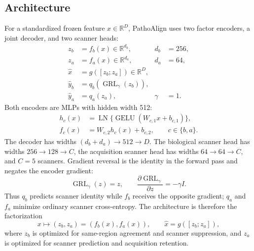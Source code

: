 \subsection{Architecture}
For a standardized frozen feature $x\in\mathbb{R}^{D}$, PathoAlign uses two factor encoders, a joint decoder, and two scanner heads:
\begin{align}
 z_b &= f_b(x)\in\mathbb{R}^{d_b}, & d_b&=256,\\
 z_a &= f_a(x)\in\mathbb{R}^{d_a}, & d_a&=64,\\
 \widehat{x} &= g([z_b;z_a])\in\mathbb{R}^{D},\\
 \widehat{y}_{b} &= q_b(\operatorname{GRL}_{\gamma}(z_b)),\\
 \widehat{y}_{a} &= q_a(z_a), & \gamma&=1.
\end{align}
Both encoders are MLPs with hidden width 512:
\begin{align}
 h_c(x)&=\operatorname{LN}\{\operatorname{GELU}(W_{c,1}x+b_{c,1})\},\\
 f_c(x)&=W_{c,2}h_c(x)+b_{c,2},\qquad c\in\{b,a\}.
\end{align}
The decoder has widths $(d_b+d_a)\to512\to D$. The biological scanner head has widths $256\to128\to C$, the acquisition scanner head has widths $64\to64\to C$, and $C=5$ scanners. Gradient reversal is the identity in the forward pass and negates the encoder gradient:
\begin{equation}
 \operatorname{GRL}_{\gamma}(z)=z,
 \qquad
 \frac{\partial\operatorname{GRL}_{\gamma}}{\partial z}=-\gamma I.
\end{equation}
Thus $q_b$ predicts scanner identity while $f_b$ receives the opposite gradient; $q_a$ and $f_a$ minimize ordinary scanner cross-entropy. The architecture is therefore the factorization
\begin{equation}
 x\mapsto (z_b,z_a)=(f_b(x),f_a(x)),
 \qquad
 \widehat{x}=g([z_b;z_a]),
\end{equation}
where $z_b$ is optimized for same-region agreement and scanner suppression, and $z_a$ is optimized for scanner prediction and acquisition retention.

